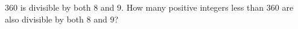 $360$ is divisible by both $8$ and $9$. How many positive integers less than $360$ are also divisible by both $8$ and $9$?

